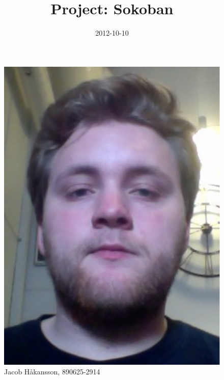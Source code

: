 \documentclass[article,11pt]{article}
\title{Project: Sokoban}
\date{2012-10-10}
\begin{document}
\maketitle
{}
\begin{table}[ht]
\begin{tabular}[l]
\begin{figure}[h]
\includegraphics[scale=0.4]{bob2.pdf}
\caption{Jacob Håkansson, 890625-2914}
\end{figure}
\begin{figure}[h]

\end{figure}
\end{tabular}
\end{table}
\end{document}
